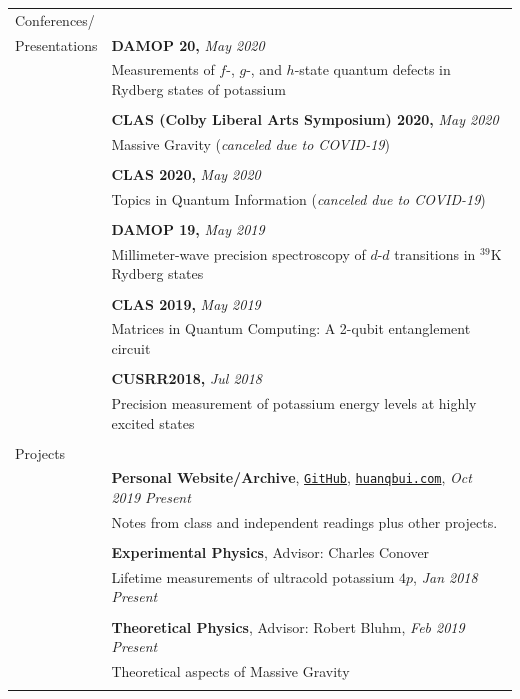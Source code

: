\documentclass[10pt]{article}
\begin{document}
\begin{longtable}{ l m{14.5cm}   }
     					
\large{Conferences/}   	& \\
\large{Presentations}	& \textbf{DAMOP 20,} \textit{May 2020}\\
	& Measurements of $f$-, $g$-, and $h$-state quantum defects in Rydberg states of potassium\\
	&\\
	& \textbf{CLAS (Colby Liberal Arts Symposium) 2020,} \textit{May 2020}\\
	& Massive Gravity (\textit{canceled due to COVID-19})\\
	& \\
	& \textbf{CLAS 2020,} \textit{May 2020}\\
	& Topics in Quantum Information (\textit{canceled due to COVID-19})\\
	& \\
	& \textbf{DAMOP 19,} \textit{May 2019} \\
	& Millimeter-wave precision spectroscopy of $d$-$d$ transitions in $^{\text{39}}$K Rydberg states\\
	& \\
	& \textbf{CLAS 2019,} \textit{May 2019}\\
	& Matrices in Quantum Computing: A 2-qubit entanglement circuit\\
	&\\
	& \textbf{CUSRR2018,} \textit{Jul 2018}\\
	& Precision measurement of potassium energy levels at highly excited states\\
	& \\ 
	
	
	\large{Projects}		& \\ 
	& \textbf{Personal Website/Archive}, \href{https://github.com/huanium/huanium}{\texttt{GitHub}},  \href{https://huanqbui.com}{\texttt{huanqbui.com}}, \textit{Oct 2019 \textendash Present} \\
	& Notes from class and independent readings plus other projects.\\
	& \\
	
	& \textbf{Experimental Physics}, Advisor: Charles Conover \\
	& Lifetime measurements of ultracold potassium $4p$, \textit{Jan 2018 \textendash Present}\\
	& \\
	
	& \textbf{Theoretical Physics}, Advisor: Robert Bluhm, \textit{Feb 2019 \textendash Present}\\
	& Theoretical aspects of Massive Gravity\\
	& \\
	

\end{longtable}
\end{document}
